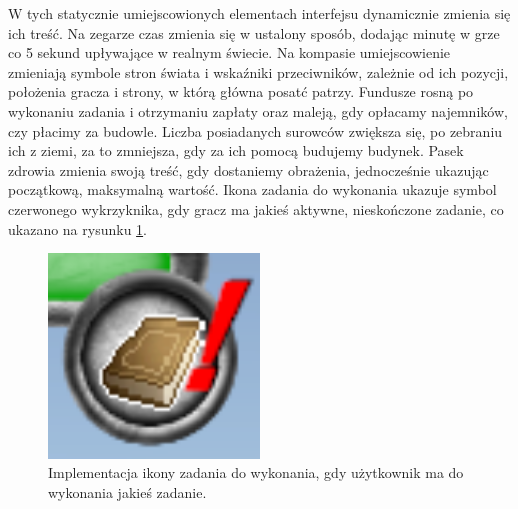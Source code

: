 W tych statycznie umiejscowionych elementach interfejsu dynamicznie zmienia się ich treść. Na zegarze czas zmienia się w ustalony sposób,
dodając minutę w grze co 5 sekund upływające w realnym świecie. Na kompasie umiejscowienie zmieniają symbole stron świata i wskaźniki przeciwników,
zależnie od ich pozycji, położenia gracza i strony, w którą główna posatć patrzy. Fundusze rosną po wykonaniu zadania i otrzymaniu zapłaty oraz maleją, gdy opłacamy
najemników, czy płacimy za budowle. Liczba posiadanych surowców zwiększa się, po zebraniu ich z ziemi, za to zmniejsza, gdy za ich pomocą budujemy budynek.  
Pasek zdrowia zmienia swoją treść, gdy dostaniemy obrażenia, jednocześnie ukazując początkową, maksymalną wartość. Ikona zadania do wykonania ukazuje symbol 
czerwonego wykrzyknika, gdy gracz ma jakieś aktywne, nieskończone zadanie, co ukazano na rysunku \ref{fig:wyq}.
\begin{figure}[htbp]
    \centering
    \includegraphics[width=0.5\textwidth]{images/ui/wykrzyknik_quest.png}
    \caption{Implementacja ikony zadania do wykonania, gdy użytkownik ma do wykonania jakieś zadanie.
    }\label{fig:wyq}
\end{figure}

